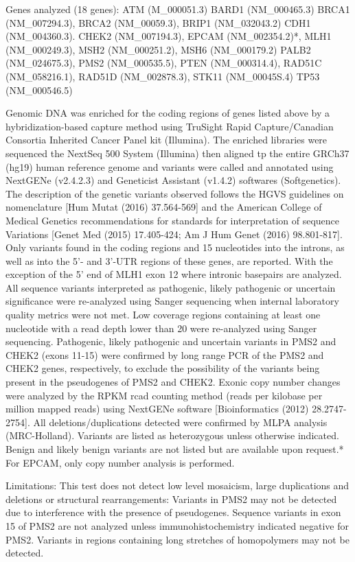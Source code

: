 \documentclass[10pt]{article}
\begin{document}
{\small
Genes analyzed (18 genes): ATM (M\_000051.3) BARD1 (NM\_000465.3) BRCA1 (NM\_007294.3), BRCA2 (NM\_00059.3), BRIP1 (NM\_032043.2) CDH1 (NM\_004360.3). CHEK2 (NM\_007194.3), EPCAM (NM\_002354.2)*, MLH1 (NM\_000249.3), MSH2 (NM\_000251.2), MSH6 (NM\_000179.2) PALB2 (NM\_024675.3), PMS2 (NM\_000535.5), PTEN (NM\_000314.4), RAD51C (NM\_058216.1), RAD51D (NM\_002878.3), STK11 (NM\_00045S.4) TP53 (NM\_000546.5) 

Genomic DNA was enriched for the coding regions of genes listed above by a hybridization-based capture method using TruSight Rapid Capture/Canadian Consortia Inherited Cancer Panel kit (Illumina). The enriched libraries were sequenced the NextSeq 500 System (Illumina) then aligned tp the entire GRCh37 (hg19) human reference genome and variants were called and annotated using NextGENe (v2.4.2.3) and Geneticist Assistant (v1.4.2) softwares (Softgenetics). The description of the genetic variants observed follows the HGVS guidelines on nomenclature [Hum Mutat (2016) 37.564-569] and the American College of Medical Genetics recommendations for standards for interpretation of sequence Variations [Genet Med (2015) 17.405-424; Am J Hum Genet (2016) 98.801-817]. Only variants found in the coding regions and 15 nucleotides into the introns, as well as into the 5'- and 3'-UTR regions of these genes, are reported. With the exception of the 5' end of MLH1 exon 12 where intronic basepairs are analyzed. All sequence variants interpreted as pathogenic, likely pathogenic or uncertain significance were re-analyzed using Sanger sequencing when internal laboratory quality metrics were not met. Low coverage regions containing at least one nucleotide with a read depth lower than 20 were re-analyzed using Sanger sequencing. Pathogenic, likely pathogenic and uncertain variants in PMS2 and CHEK2 (exons 11-15) were confirmed by long range PCR of the PMS2 and CHEK2 genes, respectively, to exclude the possibility of the variants being present in the pseudogenes of PMS2 and CHEK2. Exonic copy number changes were analyzed by the RPKM rcad counting method (reads per kilobase per million mapped reads) using NextGENe software [Bioinformatics (2012) 28.2747-2754]. All deletions/duplications detected were confirmed by MLPA analysis (MRC-Holland). Variants are listed as heterozygous unless otherwise indicated.  Benign and likely benign variants are not listed but are available upon request.* For EPCAM, only copy number analysis is performed.

Limitations: This test does not detect low level mosaicism, large duplications and deletions or structural rearrangements: Variants in PMS2 may not be detected due to interference with the presence of pseudogenes. Sequence variants in exon 15 of PMS2 are not analyzed unless immunohistochemistry indicated negative for PMS2. Variants in regions containing long stretches of homopolymers may not be detected.

}
\end{document}
